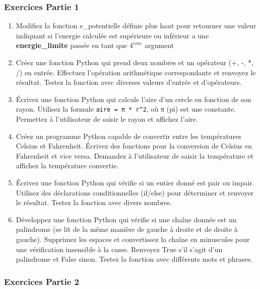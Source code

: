 \documentclass[11pt]{article}
\begin{document}
\hypertarget{exercices-partie-1}{%
\subsubsection{Exercices Partie 1}\label{exercices-partie-1}}

\begin{enumerate}
\def\labelenumi{\arabic{enumi}.}
\item
  Modifiez la fonction e\_potentielle définie plus haut pour retourner
  une valeur indiquant si l'energie calculée est supérieure ou inférieur
  a une \textbf{energie\_limite} passée en tant que \(4^{eme}\) argument
\item
  Créez une fonction Python qui prend deux nombres et un opérateur (+,
  -, *, /) en entrée. Effectuez l'opération arithmétique correspondante
  et renvoyez le résultat. Testez la fonction avec diverses valeurs
  d'entrée et d'opérateurs.
\item
  Écrivez une fonction Python qui calcule l'aire d'un cercle en fonction
  de son rayon. Utilisez la formule \texttt{aire\ =\ π\ *\ r\^{}2}, où π
  (pi) est une constante. Permettez à l'utilisateur de saisir le rayon
  et affichez l'aire.
\item
  Créez un programme Python capable de convertir entre les températures
  Celsius et Fahrenheit. Écrivez des fonctions pour la conversion de
  Celsius en Fahrenheit et vice versa. Demandez à l'utilisateur de
  saisir la température et affichez la température convertie.
\item
  Écrivez une fonction Python qui vérifie si un entier donné est pair ou
  impair. Utilisez des déclarations conditionnelles (if/else) pour
  déterminer et renvoyer le résultat. Testez la fonction avec divers
  nombres.
\item
  Développez une fonction Python qui vérifie si une chaîne donnée est un
  palindrome (se lit de la même manière de gauche à droite et de droite
  à gauche). Supprimez les espaces et convertissez la chaîne en
  minuscules pour une vérification insensible à la casse. Renvoyez True
  s'il s'agit d'un palindrome et False sinon. Testez la fonction avec
  différents mots et phrases.
\end{enumerate}

\hypertarget{exercices-partie-2}{%
\subsubsection{Exercices Partie 2}\label{exercices-partie-2}}
\end{document}
